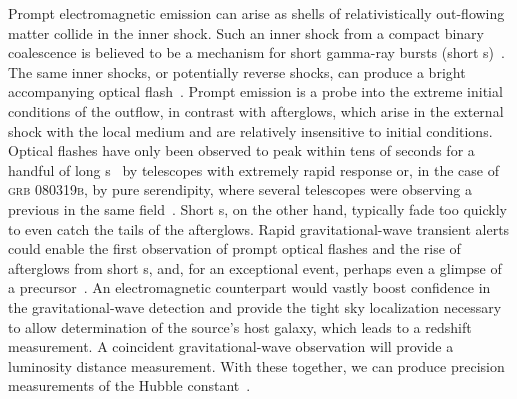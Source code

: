 Prompt electromagnetic emission can arise as shells of relativistically
out-flowing matter collide in the inner shock. Such an inner shock from a
compact binary coalescence is believed to be a mechanism for short gamma-ray
bursts (short \GRB{}s)~\cite{Lee:2005, nakar07}. The same inner shocks, or
potentially reverse shocks, can produce a bright accompanying optical
flash~\cite{Sari99}. Prompt emission is a probe into the extreme initial
conditions of the outflow, in contrast with afterglows, which arise in the
external shock with the local medium and are relatively
insensitive to initial conditions. Optical flashes have only been observed to
peak within tens of seconds for a handful of long
\GRB{}s~\cite{2011CRPhy..12..255A} by telescopes with extremely rapid response
or, in the case of \textsc{grb 080319b}, by pure serendipity, where several
telescopes were observing a previous \GRB{} in the same
field~\cite{2008Natur.455..183R}. Short \GRB{}s, on the other hand, typically
fade too quickly to even catch the tails of the afterglows. Rapid
gravitational-wave transient alerts could enable the first observation of
prompt optical flashes and the rise of afterglows from short \GRB{}s, and, for
an exceptional event, perhaps even a glimpse of a
precursor~\cite{0004-637X-723-2-1711}. An electromagnetic counterpart would
vastly boost confidence in the gravitational-wave detection and provide the
tight sky localization necessary to allow determination of the source's host
galaxy, which leads to a redshift measurement. A coincident gravitational-wave
observation will provide a luminosity distance measurement. With these
together, we can produce precision measurements of the Hubble
constant~\cite{2010ApJ...725..496N}.

